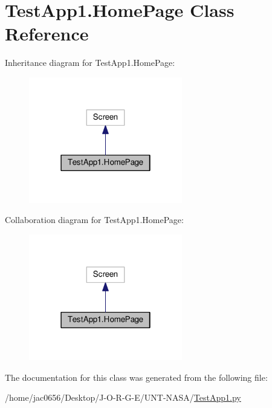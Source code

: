 \hypertarget{classTestApp1_1_1HomePage}{}\section{Test\+App1.\+Home\+Page Class Reference}
\label{classTestApp1_1_1HomePage}


Inheritance diagram for Test\+App1.\+Home\+Page\+:\nopagebreak
\begin{figure}[H]
\begin{center}
\leavevmode
\includegraphics[width=190pt]{classTestApp1_1_1HomePage__inherit__graph}
\end{center}
\end{figure}


Collaboration diagram for Test\+App1.\+Home\+Page\+:\nopagebreak
\begin{figure}[H]
\begin{center}
\leavevmode
\includegraphics[width=190pt]{classTestApp1_1_1HomePage__coll__graph}
\end{center}
\end{figure}


The documentation for this class was generated from the following file\+:\begin{DoxyCompactItemize}
\item 
/home/jac0656/\+Desktop/\+J-\/\+O-\/\+R-\/\+G-\/\+E/\+U\+N\+T-\/\+N\+A\+S\+A/\hyperlink{TestApp1_8py}{Test\+App1.\+py}\end{DoxyCompactItemize}
